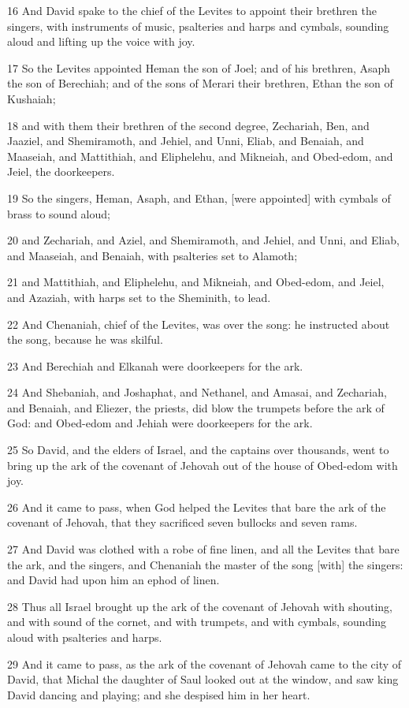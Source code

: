 \par 16 And David spake to the chief of the Levites to appoint their brethren the singers, with instruments of music, psalteries and harps and cymbals, sounding aloud and lifting up the voice with joy.
\par 17 So the Levites appointed Heman the son of Joel; and of his brethren, Asaph the son of Berechiah; and of the sons of Merari their brethren, Ethan the son of Kushaiah;
\par 18 and with them their brethren of the second degree, Zechariah, Ben, and Jaaziel, and Shemiramoth, and Jehiel, and Unni, Eliab, and Benaiah, and Maaseiah, and Mattithiah, and Eliphelehu, and Mikneiah, and Obed-edom, and Jeiel, the doorkeepers.
\par 19 So the singers, Heman, Asaph, and Ethan, [were appointed] with cymbals of brass to sound aloud;
\par 20 and Zechariah, and Aziel, and Shemiramoth, and Jehiel, and Unni, and Eliab, and Maaseiah, and Benaiah, with psalteries set to Alamoth;
\par 21 and Mattithiah, and Eliphelehu, and Mikneiah, and Obed-edom, and Jeiel, and Azaziah, with harps set to the Sheminith, to lead.
\par 22 And Chenaniah, chief of the Levites, was over the song: he instructed about the song, because he was skilful.
\par 23 And Berechiah and Elkanah were doorkeepers for the ark.
\par 24 And Shebaniah, and Joshaphat, and Nethanel, and Amasai, and Zechariah, and Benaiah, and Eliezer, the priests, did blow the trumpets before the ark of God: and Obed-edom and Jehiah were doorkeepers for the ark.
\par 25 So David, and the elders of Israel, and the captains over thousands, went to bring up the ark of the covenant of Jehovah out of the house of Obed-edom with joy.
\par 26 And it came to pass, when God helped the Levites that bare the ark of the covenant of Jehovah, that they sacrificed seven bullocks and seven rams.
\par 27 And David was clothed with a robe of fine linen, and all the Levites that bare the ark, and the singers, and Chenaniah the master of the song [with] the singers: and David had upon him an ephod of linen.
\par 28 Thus all Israel brought up the ark of the covenant of Jehovah with shouting, and with sound of the cornet, and with trumpets, and with cymbals, sounding aloud with psalteries and harps.
\par 29 And it came to pass, as the ark of the covenant of Jehovah came to the city of David, that Michal the daughter of Saul looked out at the window, and saw king David dancing and playing; and she despised him in her heart.


